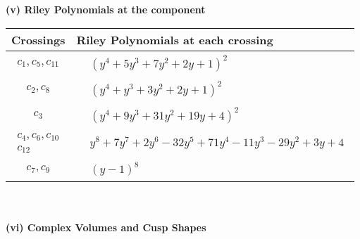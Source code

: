 \documentclass[1p]{elsarticle_modified}
\theoremstyle{definition}
\begin{document}
\newpage\renewcommand{\arraystretch}{1}
\flushleft \textbf{(v) Riley Polynomials at the component}\newline \\
\begin{tabular}{m{50pt}|m{274pt}}
Crossings & \hspace{64pt}Riley Polynomials at each crossing \\
\hline $$\begin{aligned}c_{1},c_{5},c_{11}\end{aligned}$$&$\begin{aligned}
&(y^4+5 y^3+7 y^2+2 y+1)^2
\end{aligned}$\\
\hline $$\begin{aligned}c_{2},c_{8}\end{aligned}$$&$\begin{aligned}
&(y^4+y^3+3 y^2+2 y+1)^2
\end{aligned}$\\
\hline $$\begin{aligned}c_{3}\end{aligned}$$&$\begin{aligned}
&(y^4+9 y^3+31 y^2+19 y+4)^2
\end{aligned}$\\
\hline $$\begin{aligned}c_{4},c_{6},c_{10}\\c_{12}\end{aligned}$$&$\begin{aligned}
&y^8+7 y^7+2 y^6-32 y^5+71 y^4-11 y^3-29 y^2+3 y+4
\end{aligned}$\\
\hline $$\begin{aligned}c_{7},c_{9}\end{aligned}$$&$\begin{aligned}
&(y-1)^8
\end{aligned}$\\
\hline
\end{tabular}\\~\\
\newpage\flushleft \textbf{(vi) Complex Volumes and Cusp Shapes}
\end{document}
